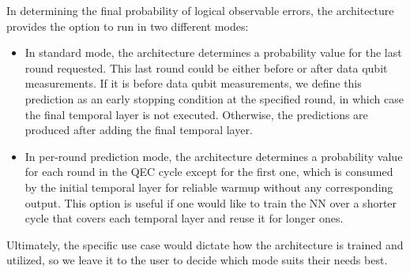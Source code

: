 In determining the final probability of logical observable errors, the architecture provides the option to run in two different modes:
\begin{itemize}
\item In standard mode, the architecture determines a probability value for the last round requested. This last round could be either before or after data qubit measurements. If it is before data qubit measurements, we define this prediction as an early stopping condition at the specified round, in which case the final temporal layer is not executed. Otherwise, the predictions are produced after adding the final temporal layer.
\item In per-round prediction mode, the architecture determines a probability value for each round in the QEC cycle except for the first one, which is consumed by the initial temporal layer for reliable warmup without any corresponding output. This option is useful if one would like to train the NN over a shorter cycle that covers each temporal layer and reuse it for longer ones.
\end{itemize}
Ultimately, the specific use case would dictate how the architecture is trained and utilized, so we leave it to the user to decide which mode suits their needs best.
